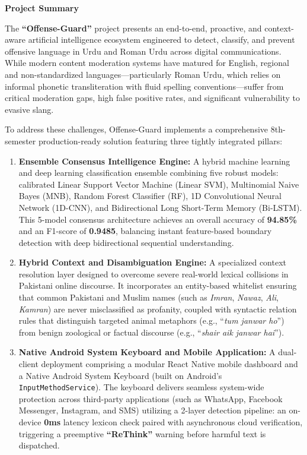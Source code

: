 \documentclass[A4paper,12pt]{report}
\theoremstyle{plain}
\theoremstyle{definition}
\theoremstyle{remark}
\numberwithin{equation}{section}
\begin{document}
\newpage
\begin{center}
\Large{\textbf{Project Summary}}
\end{center}
\setlength{\parindent}{0pt}
\normalsize{The \textbf{``Offense-Guard''} project presents an end-to-end, proactive, and context-aware artificial intelligence ecosystem engineered to detect, classify, and prevent offensive language in Urdu and Roman Urdu across digital communications. While modern content moderation systems have matured for English, regional and non-standardized languages---particularly Roman Urdu, which relies on informal phonetic transliteration with fluid spelling conventions---suffer from critical moderation gaps, high false positive rates, and significant vulnerability to evasive slang.

To address these challenges, Offense-Guard implements a comprehensive 8th-semester production-ready solution featuring three tightly integrated pillars:
\begin{enumerate}[leftmargin=*]
    \item \textbf{Ensemble Consensus Intelligence Engine:} A hybrid machine learning and deep learning classification ensemble combining five robust models: calibrated Linear Support Vector Machine (Linear SVM), Multinomial Naive Bayes (MNB), Random Forest Classifier (RF), 1D Convolutional Neural Network (1D-CNN), and Bidirectional Long Short-Term Memory (Bi-LSTM). This 5-model consensus architecture achieves an overall accuracy of \textbf{94.85\%} and an F1-score of \textbf{0.9485}, balancing instant feature-based boundary detection with deep bidirectional sequential understanding.
    \item \textbf{Hybrid Context and Disambiguation Engine:} A specialized context resolution layer designed to overcome severe real-world lexical collisions in Pakistani online discourse. It incorporates an entity-based whitelist ensuring that common Pakistani and Muslim names (such as \textit{Imran}, \textit{Nawaz}, \textit{Ali}, \textit{Kamran}) are never misclassified as profanity, coupled with syntactic relation rules that distinguish targeted animal metaphors (e.g., ``\textit{tum janwar ho}'') from benign zoological or factual discourse (e.g., ``\textit{shair aik janwar hai}'').
    \item \textbf{Native Android System Keyboard and Mobile Application:} A dual-client deployment comprising a modular React Native mobile dashboard and a Native Android System Keyboard (built on Android's \texttt{InputMethodService}). The keyboard delivers seamless system-wide protection across third-party applications (such as WhatsApp, Facebook Messenger, Instagram, and SMS) utilizing a 2-layer detection pipeline: an on-device \textbf{0ms} latency lexicon check paired with asynchronous cloud verification, triggering a preemptive \textbf{``ReThink''} warning before harmful text is dispatched.
\end{enumerate}

}
\end{document}
